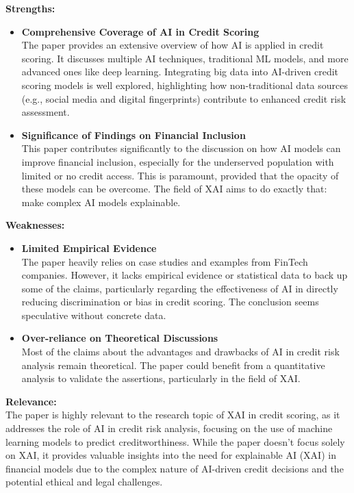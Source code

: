 \documentclass[12pt,a4paper]{article}
\begin{document}
\begin{enumerate}
    \textbf{Strengths:}\\
    \vspace{-2em}
    \begin{itemize}
        \item \textbf{Comprehensive Coverage of AI in Credit Scoring}\\
        The paper provides an extensive overview of how AI is applied in credit scoring. It discusses multiple AI techniques, traditional ML models, and more advanced ones like deep learning. Integrating big data into AI-driven credit scoring models is well explored, highlighting how non-traditional data sources (e.g., social media and digital fingerprints) contribute to enhanced credit risk assessment.
        \item \textbf{Significance of Findings on Financial Inclusion}\\
        This paper contributes significantly to the discussion on how AI models can improve financial inclusion, especially for the underserved population with limited or no credit access. This is paramount, provided that the opacity of these models can be overcome. The field of XAI aims to do exactly that: make complex AI models explainable.
    \end{itemize}

    \textbf{Weaknesses:}\\
    \vspace{-2em}
    \begin{itemize}
        \item \textbf{Limited Empirical Evidence}\\
        The paper heavily relies on case studies and examples from FinTech companies. However, it lacks empirical evidence or statistical data to back up some of the claims, particularly regarding the effectiveness of AI in directly reducing discrimination or bias in credit scoring. The conclusion seems speculative without concrete data.
        \item \textbf{Over-reliance on Theoretical Discussions}\\
        Most of the claims about the advantages and drawbacks of AI in credit risk analysis remain theoretical. The paper could benefit from a quantitative analysis to validate the assertions, particularly in the field of XAI.
    \end{itemize}

    \textbf{Relevance:}\\
    The paper is highly relevant to the research topic of XAI in credit scoring, as it addresses the role of AI in credit risk analysis, focusing on the use of machine learning models to predict creditworthiness. While the paper doesn't focus solely on XAI, it provides valuable insights into the need for explainable AI (XAI) in financial models due to the complex nature of AI-driven credit decisions and the potential ethical and legal challenges.

\end{enumerate}
\end{document}
